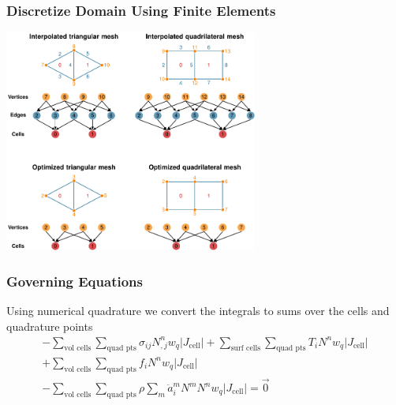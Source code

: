 \documentclass{beamer}
\begin{document}
\begin{frame}
  \frametitle{Discretize Domain Using Finite Elements}
 
   \begin{center}
     \includegraphics[height=7.3cm]{figs/meshtopology}
   \end{center}
   
 \end{frame}
 

\begin{frame}
  \frametitle{Governing Equations}
  \summary{}

  Using numerical quadrature we convert the integrals to sums over the
  cells and quadrature points
  \begin{multline}
    -\sum_\text{vol cells} \sum_\text{quad pts} \sigma_{ij} N^n_{,j} w_q |J_\text{cell}|
    + \sum_\text{surf cells} \sum_\text{quad pts} T_i N^n w_q |J_\text{cell}|\\
    + \sum_\text{vol cells} \sum_\text{quad pts}  f_i N^n w_q |J_\text{cell}|\\
    - \sum_\text{vol cells} \sum_\text{quad pts} \rho \sum_m \ddot{a}^m_i N^m N^n w_q |J_\text{cell}| = \vec{0}    
  \end{multline}

\end{frame}
\end{document}
